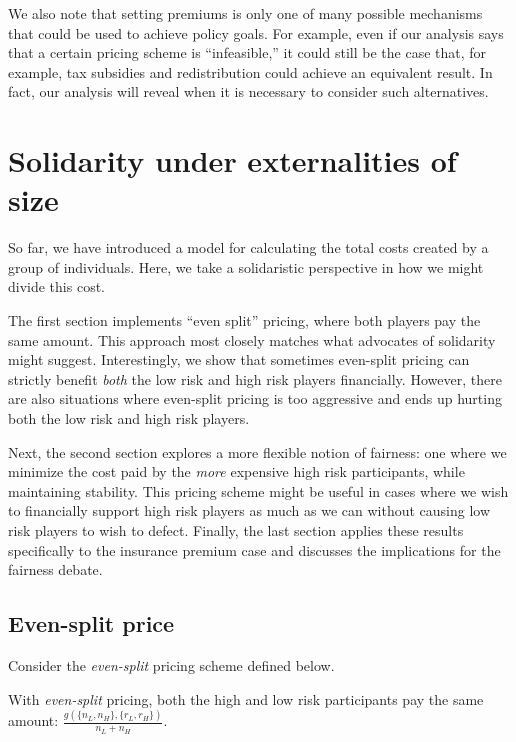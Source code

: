 \documentclass[sigconf]{acmart}
\newcommand{\nL}[0]{\ensuremath{n_L}}
\newcommand{\nH}[0]{\ensuremath{n_H}}
\newcommand{\rL}[0]{\ensuremath{r_L}}
\newcommand{\rH}[0]{\ensuremath{r_H}}
\newcommand{\cost}[0]{\ensuremath{g}}
\begin{document}
We also note that setting premiums is only one of many possible mechanisms that could be used to achieve policy goals. For example, even if our analysis says that a certain pricing scheme is \enquote{infeasible,} it could still be the case that, for example, tax subsidies and redistribution could achieve an equivalent result. In fact, our analysis will reveal when it is necessary to consider such alternatives.

\section{Solidarity under externalities of size}\label{solidarity}

So far, we have introduced a model for calculating the total costs created by a group of individuals. Here, we take a solidaristic perspective in how we might divide this cost.  

The first section implements \enquote{even split} pricing, where both players pay the same amount. This approach most closely matches what advocates of solidarity might suggest. Interestingly, we show that sometimes even-split pricing can strictly benefit \emph{both} the low risk and high risk players financially. However, there are also situations where even-split pricing is too aggressive and ends up hurting both the low risk and high risk players.

Next, the second section explores a more flexible notion of fairness: one where we minimize the cost paid by the \emph{more} expensive high risk participants, while maintaining stability. This pricing scheme might be useful in cases where we wish to financially support high risk players as much as we can without causing low risk players to wish to defect. Finally, the last section applies these results specifically to the insurance premium case and discusses the implications for the fairness debate. 


\subsection{Even-split price}
Consider the \emph{even-split} pricing scheme defined below. 

\begin{definition}\label{def:evensplit}
With \emph{even-split} pricing, both the high and low risk participants pay the same amount: $\frac{\cost(\{\nL,\nH \}, \{\rL, \rH\})}{\nL + \nH}$. 
\end{definition}
\end{document}
